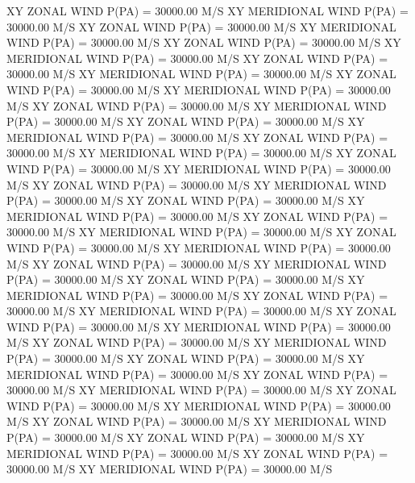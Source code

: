  XY ZONAL WIND          P(PA) =     30000.00       M/S
 XY MERIDIONAL WIND     P(PA) =     30000.00       M/S
 XY ZONAL WIND          P(PA) =     30000.00       M/S
 XY MERIDIONAL WIND     P(PA) =     30000.00       M/S
 XY ZONAL WIND          P(PA) =     30000.00       M/S
 XY MERIDIONAL WIND     P(PA) =     30000.00       M/S
 XY ZONAL WIND          P(PA) =     30000.00       M/S
 XY MERIDIONAL WIND     P(PA) =     30000.00       M/S
 XY ZONAL WIND          P(PA) =     30000.00       M/S
 XY MERIDIONAL WIND     P(PA) =     30000.00       M/S
 XY ZONAL WIND          P(PA) =     30000.00       M/S
 XY MERIDIONAL WIND     P(PA) =     30000.00       M/S
 XY ZONAL WIND          P(PA) =     30000.00       M/S
 XY MERIDIONAL WIND     P(PA) =     30000.00       M/S
 XY ZONAL WIND          P(PA) =     30000.00       M/S
 XY MERIDIONAL WIND     P(PA) =     30000.00       M/S
 XY ZONAL WIND          P(PA) =     30000.00       M/S
 XY MERIDIONAL WIND     P(PA) =     30000.00       M/S
 XY ZONAL WIND          P(PA) =     30000.00       M/S
 XY MERIDIONAL WIND     P(PA) =     30000.00       M/S
 XY ZONAL WIND          P(PA) =     30000.00       M/S
 XY MERIDIONAL WIND     P(PA) =     30000.00       M/S
 XY ZONAL WIND          P(PA) =     30000.00       M/S
 XY MERIDIONAL WIND     P(PA) =     30000.00       M/S
 XY ZONAL WIND          P(PA) =     30000.00       M/S
 XY MERIDIONAL WIND     P(PA) =     30000.00       M/S
 XY ZONAL WIND          P(PA) =     30000.00       M/S
 XY MERIDIONAL WIND     P(PA) =     30000.00       M/S
 XY ZONAL WIND          P(PA) =     30000.00       M/S
 XY MERIDIONAL WIND     P(PA) =     30000.00       M/S
 XY ZONAL WIND          P(PA) =     30000.00       M/S
 XY MERIDIONAL WIND     P(PA) =     30000.00       M/S
 XY ZONAL WIND          P(PA) =     30000.00       M/S
 XY MERIDIONAL WIND     P(PA) =     30000.00       M/S
 XY ZONAL WIND          P(PA) =     30000.00       M/S
 XY MERIDIONAL WIND     P(PA) =     30000.00       M/S
 XY ZONAL WIND          P(PA) =     30000.00       M/S
 XY MERIDIONAL WIND     P(PA) =     30000.00       M/S
 XY ZONAL WIND          P(PA) =     30000.00       M/S
 XY MERIDIONAL WIND     P(PA) =     30000.00       M/S
 XY ZONAL WIND          P(PA) =     30000.00       M/S
 XY MERIDIONAL WIND     P(PA) =     30000.00       M/S
 XY ZONAL WIND          P(PA) =     30000.00       M/S
 XY MERIDIONAL WIND     P(PA) =     30000.00       M/S
 XY ZONAL WIND          P(PA) =     30000.00       M/S
 XY MERIDIONAL WIND     P(PA) =     30000.00       M/S
 XY ZONAL WIND          P(PA) =     30000.00       M/S
 XY MERIDIONAL WIND     P(PA) =     30000.00       M/S

